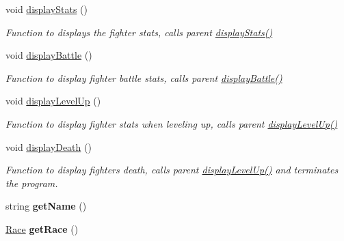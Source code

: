 \begin{DoxyCompactItemize}
void \hyperlink{class_fighter_a9e63e29c35aaca0bc60ee46efe00cc62}{display\+Stats} ()
\begin{DoxyCompactList}\small\item\em Function to displays the fighter stats, calls parent \hyperlink{class_fighter_a9e63e29c35aaca0bc60ee46efe00cc62}{display\+Stats()} \end{DoxyCompactList}\item 
\hypertarget{class_fighter_ad519375531d2f4ae2bc8896e3595d5f4}{}\label{class_fighter_ad519375531d2f4ae2bc8896e3595d5f4} 
void \hyperlink{class_fighter_ad519375531d2f4ae2bc8896e3595d5f4}{display\+Battle} ()
\begin{DoxyCompactList}\small\item\em Function to display fighter battle stats, calls parent \hyperlink{class_fighter_ad519375531d2f4ae2bc8896e3595d5f4}{display\+Battle()} \end{DoxyCompactList}\item 
\hypertarget{class_fighter_afa53e25a50772d86c5e929c6df1354ad}{}\label{class_fighter_afa53e25a50772d86c5e929c6df1354ad} 
void \hyperlink{class_fighter_afa53e25a50772d86c5e929c6df1354ad}{display\+Level\+Up} ()
\begin{DoxyCompactList}\small\item\em Function to display fighter stats when leveling up, calls parent \hyperlink{class_fighter_afa53e25a50772d86c5e929c6df1354ad}{display\+Level\+Up()} \end{DoxyCompactList}\item 
\hypertarget{class_fighter_a6a050f0b907517b09627fe16cea6e341}{}\label{class_fighter_a6a050f0b907517b09627fe16cea6e341} 
void \hyperlink{class_fighter_a6a050f0b907517b09627fe16cea6e341}{display\+Death} ()
\begin{DoxyCompactList}\small\item\em Function to display fighter\textquotesingle{}s death, calls parent \hyperlink{class_fighter_afa53e25a50772d86c5e929c6df1354ad}{display\+Level\+Up()} and terminates the program. \end{DoxyCompactList}\item 
\hypertarget{class_fighter_abf4d82d4a17d37d3b5ca4084debabde4}{}\label{class_fighter_abf4d82d4a17d37d3b5ca4084debabde4} 
string {\bfseries get\+Name} ()
\item 
\hypertarget{class_fighter_a2a733caf375a8d2e1c514418267e5017}{}\label{class_fighter_a2a733caf375a8d2e1c514418267e5017} 
\hyperlink{_entity_8h_aa2df4028f474807638d438104900b003}{Race} {\bfseries get\+Race} ()

\end{DoxyCompactItemize}
